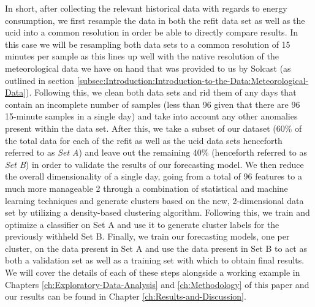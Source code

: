 \noindent \newline In short, after collecting the relevant historical data with regards to energy consumption, we first resample the data in both the \gls{refit} data set as well as the \gls{ucid} into a common resolution in order be able to directly compare results. In this case we will be resampling both data sets to a common resolution of 15 minutes per sample as this lines up well with the native resolution of the meteorological data we have on hand that was provided to us by Solcast (as outlined in section  \ref{subsec:Introduction:Introduction-to-the-Data:Meteorological-Data}). Following this, we clean both data sets and rid them of any days that contain an incomplete number of samples (less than 96 given that there are 96 15-minute samples in a single day) and take into account any other anomalies present within the data set. After this, we take a subset of our dataset (60\% of the total data for each of the \gls{refit} as well as the \gls{ucid} data sets henceforth referred to as \textit{Set A}) and leave out the remaining 40\% (henceforth referred to as \textit{Set B}) in order to validate the results of our forecasting model. We then reduce the overall dimensionality of a single day, going from a total of 96 features to a much more manageable 2 through a combination of statistical and machine learning techniques and generate clusters based on the new, 2-dimensional data set by utilizing a density-based clustering algorithm. Following this, we train and optimize a classifier on Set A and use it to generate cluster labels for the previously withheld Set B. Finally, we train our forecasting models, one per cluster, on the data present in Set A and use the data present in Set B to act as both a validation set as well as a training set with which to obtain final results. We will cover the details of each of these steps alongside a working example in Chapters \ref{ch:Exploratory-Data-Analysis} and \ref{ch:Methodology} of this paper and our results can be found in Chapter \ref{ch:Results-and-Discussion}.